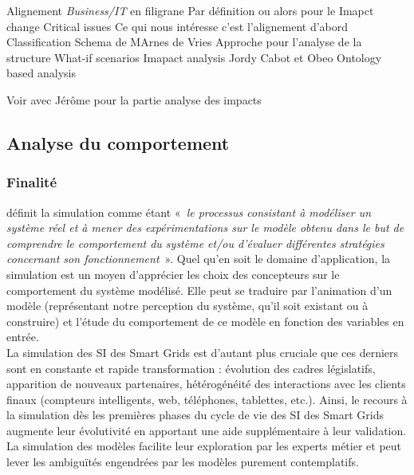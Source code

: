 	
	
	
 
	
	   
	Alignement \textit{Business/IT} en filigrane 
	Par définition ou alors pour le Imapct change 	
	Critical issues
	Ce qui nous intéresse c'est l'alignement d'abord
	Classification Schema de MArnes de Vries
	Approche pour l'analyse de la structure
	What-if scenarios
	Imapact analysis
	Jordy Cabot et Obeo
	Ontology based analysis
	
	Voir avec Jérôme pour la partie analyse des impacts

	
	\subsection{Analyse du comportement}
	\subsubsection{Finalité}
	\cite{shannon1975systems} définit la simulation comme étant
«~\emph{le processus consistant à modéliser un système réel et à mener des expérimentations sur le modèle obtenu dans le but de comprendre le comportement du système et/ou d'évaluer différentes stratégies concernant son fonctionnement}~». 
Quel qu'en soit le domaine d'application, la simulation est un moyen d'apprécier les choix des concepteurs sur le comportement du système modélisé. Elle peut se traduire par l'animation d'un modèle (représentant notre perception du système, qu'il soit existant ou à construire) et l'étude du comportement de ce modèle en fonction des variables en entrée.  
\\La simulation des SI des Smart Grids est d'autant plus cruciale que ces derniers sont en constante et rapide transformation : évolution des cadres législatifs,  apparition de nouveaux partenaires, hétérogénéité des interactions avec les clients finaux (compteurs intelligents, web, téléphones, tablettes, etc.). Ainsi, le recours à la simulation dès les premières phases du cycle de vie des SI des Smart Grids augmente leur évolutivité en apportant une aide supplémentaire à leur validation. La simulation des modèles facilite leur exploration  par les experts métier et peut lever les ambiguïtés engendrées par les modèles purement contemplatifs. 

